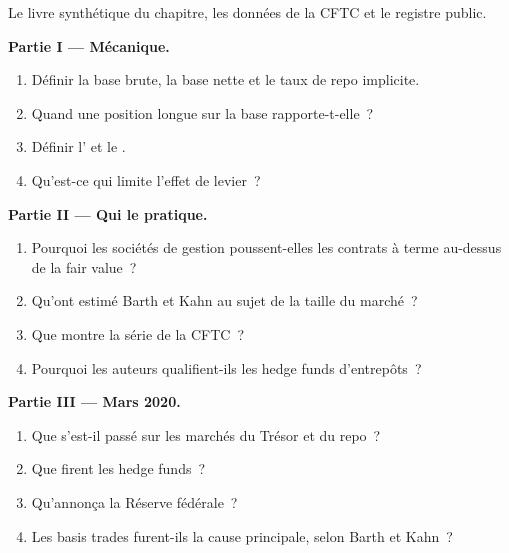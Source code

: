 \begin{problem}\label{pb:s2:the-bond-futures-basis-trade:1}
Le livre synthétique du chapitre, les données de la CFTC et le registre public.

\medskip\noindent\textbf{Partie I --- Mécanique.}
\begin{enumerate}
\item Définir la base brute, la base nette et le taux de repo implicite.
\item Quand une position longue sur la base rapporte-t-elle~?
\item Définir l' et le .
\item Qu'est-ce qui limite l'effet de levier~?
\end{enumerate}

\medskip\noindent\textbf{Partie II --- Qui le pratique.}
\begin{enumerate}[resume]
\item Pourquoi les sociétés de gestion poussent-elles les contrats à terme au-dessus de la fair value~?
\item Qu'ont estimé Barth et Kahn au sujet de la taille du marché~?
\item Que montre la série de la CFTC~?
\item Pourquoi les auteurs qualifient-ils les hedge funds d'entrepôts~?
\end{enumerate}

\medskip\noindent\textbf{Partie III --- Mars 2020.}
\begin{enumerate}[resume]
\item Que s'est-il passé sur les marchés du Trésor et du repo~?
\item Que firent les hedge funds~?
\item Qu'annonça la Réserve fédérale~?
\item Les basis trades furent-ils la cause principale, selon Barth et Kahn~?
\end{enumerate}


\end{problem}
